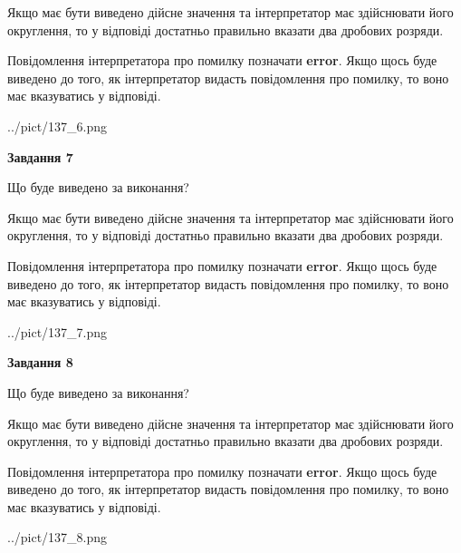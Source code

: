 \documentclass[12pt, ukrainian]{article}
\begin{document}
{\begin {Large}
Якщо має бути виведено дійсне значення та інтерпретатор має здійснювати його округлення, 
то у відповіді достатньо правильно вказати два дробових розряди.

Повідомлення інтерпретатора про помилку позначати \textbf{error}.
Якщо щось буде виведено до того, як інтерпретатор видасть повідомлення про помилку, 
то воно має вказуватись у відповіді. \par

\begin{center}
	{../pict/137_6.png}
\end{center}
\newpage

{\begin {center}\textbf{Завдання 7}\end {center}}\par
Що буде виведено за виконання? \par

Якщо має бути виведено дійсне значення та інтерпретатор має здійснювати його округлення, 
то у відповіді достатньо правильно вказати два дробових розряди.

Повідомлення інтерпретатора про помилку позначати \textbf{error}.
Якщо щось буде виведено до того, як інтерпретатор видасть повідомлення про помилку, 
то воно має вказуватись у відповіді. \par

\begin{center}
	{../pict/137_7.png}
\end{center}
\newpage

{\begin {center}\textbf{Завдання 8}\end {center}}\par
Що буде виведено за виконання? \par

Якщо має бути виведено дійсне значення та інтерпретатор має здійснювати його округлення, 
то у відповіді достатньо правильно вказати два дробових розряди.

Повідомлення інтерпретатора про помилку позначати \textbf{error}.
Якщо щось буде виведено до того, як інтерпретатор видасть повідомлення про помилку, 
то воно має вказуватись у відповіді. \par

\begin{center}
	{../pict/137_8.png}
\end{center}
\newpage


\end{Large}}
\end{document}
